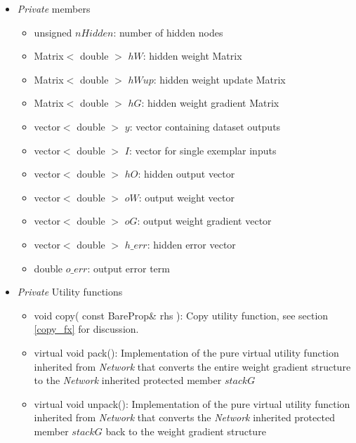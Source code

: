 \documentclass{report}
\begin{document}
\begin{itemize}
\begin{itemize}
      virtual method inherited from {\em Network} which is called by
      trainSet() to calculate the gradient and return set error, used
      for automatic stepsize selection
\item virtual void forward( Matrix$<$ double $>$\& $M$, unsigned $n$
      ): Implementation of the pure virtual method inherited from {\em
      Network} which forward propagates for one input row $n$ in a
      Matrix of inputs $M$ (e.g. either the inherited {\em Model}
      Matrix $Train$ or $Test$)
\item virtual void removeInputs( vector$<$ unsigned $>$\&
      $v$ ): Implementation of the pure virtual method which takes as
      its argument a vector of unsigned $v$ representing positions of
      input nodes, and removes those nodes from the {\em BareProp}
      object
\end{itemize}

\item {\em Private} members

\begin{itemize}
\item unsigned $nHidden$: number of hidden nodes
\item Matrix$<$ double $>$ $hW$: hidden weight Matrix
\item Matrix$<$ double $>$ $hWup$: hidden weight update Matrix
\item Matrix$<$ double $>$ $hG$: hidden weight gradient Matrix
\item vector$<$ double $>$ $y$: vector containing dataset outputs
\item vector$<$ double $>$ $I$: vector for single exemplar inputs
\item vector$<$ double $>$ $hO$: hidden output vector
\item vector$<$ double $>$ $oW$: output weight vector
\item vector$<$ double $>$ $oG$: output weight gradient vector
\item vector$<$ double $>$ $h\_err$: hidden error vector
\item double $o\_err$: output error term
\end{itemize}

\item {\em Private} Utility functions

\begin{itemize}
\item void copy( const BareProp\& rhs ): Copy utility function, see
      section \ref{copy_fx} for discussion.
\item virtual void pack(): Implementation of the pure virtual utility
      function inherited from {\em Network} that converts the entire
      weight gradient structure to the {\em Network} inherited
      protected member $stackG$
\item virtual void unpack(): Implementation of the pure virtual
      utility function inherited from {\em Network} that converts the
      {\em Network} inherited protected member $stackG$ back to the
      weight gradient structure
\end{itemize}

\end{itemize}
\end{document}
